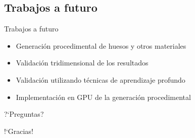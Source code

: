 \documentclass[spanish]{beamer}
\begin{document}
\subsection{Trabajos a futuro}

\begin{frame}{Trabajos a futuro}
\begin{block}{}
\begin{itemize}
\item Generación procedimental de huesos y otros materiales
\item Validación tridimensional de los resultados
\item Validación utilizando técnicas de aprendizaje profundo
\item Implementación en GPU de la generación procedimental
\end{itemize}
\end{block}
\end{frame}

\begin{frame}
\centering

?`Preguntas?

\end{frame}

\begin{frame}
\centering

!`Gracias!

\end{frame}
\end{document}
